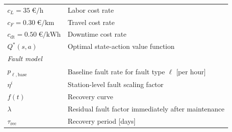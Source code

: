 \documentclass[12pt,oneside]{article}
\begin{document}
\begin{longtable}{ll}
$c_L = 35\;\text{€/h}$                             & Labor cost rate \\
$c_F = 0.30\;\text{€/km}$                          & Travel cost rate \\
$c_{\mathrm{dt}} = 0.50\;\text{€/kWh}$             & Downtime cost rate \\
$Q^*(s, a)$                                        & Optimal state-action value function \\[4pt]
\multicolumn{2}{l}{\textit{Fault model}} \\[2pt]
$p_{\ell,\mathrm{base}}$                           & Baseline fault rate for fault type $\ell$ [per hour] \\
$\eta^i$                                           & Station-level fault scaling factor \\
$f(t)$                                             & Recovery curve \\
$\lambda$                                          & Residual fault factor immediately after maintenance \\
$\tau_{\mathrm{rec}}$                             & Recovery period [days] \\
\end{longtable}




\end{document}
